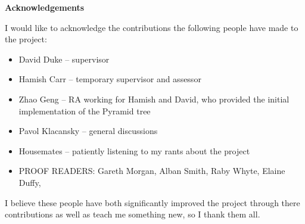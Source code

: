 \begin{center}
    {\LARGE\bf Acknowledgements}
\end{center}

I would like to acknowledge the contributions the following people have made to the project:
\begin{itemize}
	\item David Duke -- supervisor
	\item Hamish Carr -- temporary supervisor and assessor
	\item Zhao Geng -- RA working for Hamish and David, who provided the initial implementation of the Pyramid tree	
	\item Pavol Klacansky -- general discussions
	\item Housemates -- patiently listening to my rants about the project
	\item PROOF READERS: Gareth Morgan, Alban Smith, Raby Whyte, Elaine Duffy, 
\end{itemize}

I believe these people have both significantly improved the project through there contributions as well as teach me something new, so I thank them all.

